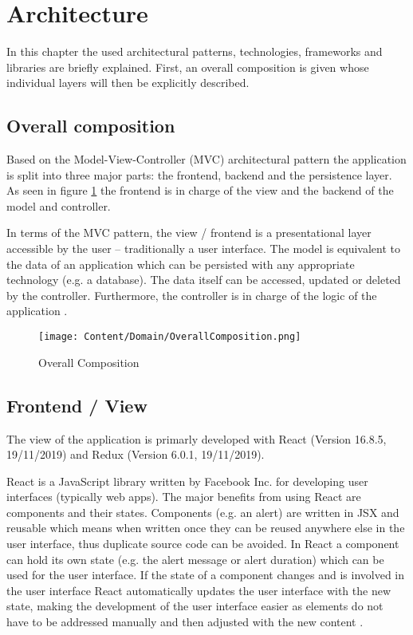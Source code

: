 
\section{Architecture}
\label{sec:DomainC}

In this chapter the used architectural patterns, technologies, frameworks and libraries are briefly explained. First, an overall composition is given whose individual layers will then be explicitly described.


\subsection{Overall composition}
\label{sec:DomainCa}
Based on the Model-View-Controller (\ac{MVC}) architectural pattern the application is split into three major parts: the frontend, backend and the persistence layer. As seen in figure \ref{fig:overallcomposition} the frontend is in charge of the view and the backend of the model and controller.

In terms of the \ac{MVC} pattern, the view / frontend is a presentational layer accessible by the user – traditionally a user interface. The model is equivalent to the data of an application which can be persisted with any appropriate technology (e.g. a database). The data itself can be accessed, updated or deleted by the controller. Furthermore, the controller is in charge of the logic of the application \cite[p. 7]{steyerWebanwendungenMitASP2017}.

\begin{figure}[H]
	\centering
	\texttt{[image: Content/Domain/OverallComposition.png]}
	\caption{Overall Composition}
	\cite{own representation}
	\label{fig:overallcomposition}
\end{figure}

\subsection{Frontend / View}
\label{sec:DomainCb}

The view of the application is primarly developed with React (Version 16.8.5, 19/11/2019) and Redux (Version 6.0.1, 19/11/2019).

React is a JavaScript library written by Facebook Inc. for developing user interfaces (typically web apps). The major benefits from using React are components and their states. Components (e.g. an alert) are written in \ac{JSX} and reusable which means when written once they can be reused anywhere else in the user interface, thus duplicate source code can be avoided. In React a component can hold its own state (e.g. the alert message or alert duration) which can be used for the user interface. If the state of a component changes and is involved in the user interface React automatically updates the user interface with the new state, making the development of the user interface easier as elements do not have to be addressed manually and then adjusted with the new content \cite[p. 7-8]{stefanovDurchstartenMitReact2017}.

